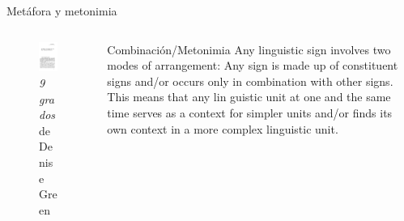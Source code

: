 \documentclass[presentation]{beamer}
\begin{document}
\begin{frame}[label={sec:orgba5e553}]{Metáfora y metonimia}
\begin{columns}
\begin{column}{0.48\columnwidth}
\begin{figure}
    \includegraphics[width=\textwidth]{./assets/cover_two_aspects.png}
\caption{\emph{9 grados} de Denise Green}
 \end{figure}
\end{column}

\begin{column}{0.48\columnwidth}
\tiny
   \begin{block}{Combinación/Metonimia}
Any linguistic sign involves two modes of arrangement:
Any sign is made up of constituent signs and/or
occurs only in combination with other signs. This means that any lin­
guistic unit at one and the same time serves as a context for simpler
units and/or finds its own context in a more complex linguistic unit.


\end{block}
\end{column}
\end{columns}
\end{frame}
\end{document}
